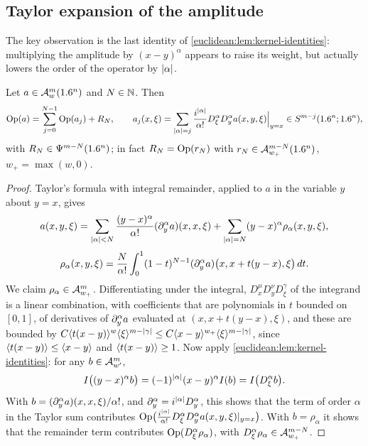 \subsection{Taylor expansion of the amplitude}

The key observation is the last identity of
\cref{euclidean:lem:kernel-identities}: multiplying the amplitude by
$(x-y)^\alpha$ appears to raise its weight, but actually lowers the order of
the operator by $\lvert \alpha\rvert$.

\begin{lemma}\label{euclidean:lem:taylor}
  Let $a\in\mathcal{A}^{m}_{w}(1.6^n)$ and $N\in\mathbb{N}$. Then
  \begin{equation*}
    \operatorname{Op}(a)=\sum_{j=0}^{N-1}\operatorname{Op}(a_j)+R_N,\qquad
    a_j(x,\xi)=\sum_{\lvert \alpha\rvert=j}\frac{i^{\lvert \alpha\rvert}}{\alpha!}
    D^\alpha_\xi D^\alpha_ya(x,y,\xi)\Big|_{y=x}\in S^{m-j}(1.6^n;1.6^n),
  \end{equation*}
  with $R_N\in\Psi^{m-N}(1.6^n)$; in fact $R_N=\operatorname{Op}(r_N)$ with
  $r_N\in\mathcal{A}^{m-N}_{w_+}(1.6^n)$, $w_+=\max(w,0)$.
\end{lemma}
\begin{proof}
  Taylor's formula with integral remainder, applied to $a$ in the variable
  $y$ about $y=x$, gives
  \begin{equation*}
    a(x,y,\xi)=\sum_{\lvert \alpha\rvert<N}\frac{(y-x)^\alpha}{\alpha!}(\partial^\alpha_ya)(x,x,\xi)
    +\sum_{\lvert \alpha\rvert=N}(y-x)^\alpha\rho_\alpha(x,y,\xi),
  \end{equation*}
  \begin{equation*}
    \rho_\alpha(x,y,\xi)=\frac{N}{\alpha!}\int_0^1(1-t)^{N-1}
    (\partial^\alpha_ya)\bigl(x,x+t(y-x),\xi\bigr)\,dt.
  \end{equation*}
  We claim $\rho_\alpha\in\mathcal{A}^{m}_{w_+}$. Differentiating under the integral,
  $D^\mu_xD^\nu_yD^\gamma_\xi$ of the integrand is a linear combination, with
  coefficients that are polynomials in $t$ bounded on $[0,1]$, of
  derivatives of $\partial^\alpha_ya$ evaluated at $(x,x+t(y-x),\xi)$, and these
  are bounded by
  $C\langle t(x-y)\rangle^w\langle \xi\rangle^{m-\lvert \gamma\rvert}\le C\langle x-y\rangle^{w_+}\langle \xi\rangle^{m-\lvert \gamma\rvert}$,
  since $\langle t(x-y)\rangle\le\langle x-y\rangle$ and $\langle t(x-y)\rangle\ge 1$.
  Now apply \cref{euclidean:lem:kernel-identities}: for any
  $b\in\mathcal{A}^{m}_{w'}$,
  \begin{equation*}
    I\bigl((y-x)^\alpha b\bigr)=(-1)^{\lvert \alpha\rvert}(x-y)^\alpha I(b)=I\bigl(D^\alpha_\xi b\bigr).
  \end{equation*}
  With $b=(\partial^\alpha_ya)(x,x,\xi)/\alpha!$, and $\partial_y^\alpha=i^{\lvert \alpha\rvert}D^\alpha_y$,
  this shows that the term of order $\alpha$ in the Taylor sum contributes
  $\operatorname{Op}\bigl(\tfrac{i^{\lvert \alpha\rvert}}{\alpha!}D^\alpha_\xi D^\alpha_ya(x,y,\xi)|_{y=x}\bigr)$.
  With $b=\rho_\alpha$ it shows that the remainder term contributes
  $\operatorname{Op}(D^\alpha_\xi\rho_\alpha)$, with
  $D^\alpha_\xi\rho_\alpha\in\mathcal{A}^{m-N}_{w_+}$.
\end{proof}

